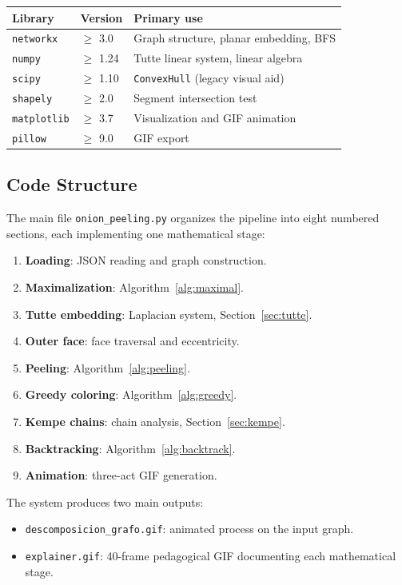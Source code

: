 \documentclass[12pt,letterpaper]{article}
\theoremstyle{plain}
\theoremstyle{definition}
\theoremstyle{remark}
\begin{document}
\begin{center}
\begin{tabular}{lll}
\toprule
\textbf{Library} & \textbf{Version} & \textbf{Primary use} \\
\midrule
\texttt{networkx}  & $\geq$ 3.0  & Graph structure, planar embedding, BFS \\
\texttt{numpy}     & $\geq$ 1.24 & Tutte linear system, linear algebra \\
\texttt{scipy}     & $\geq$ 1.10 & \texttt{ConvexHull} (legacy visual aid) \\
\texttt{shapely}   & $\geq$ 2.0  & Segment intersection test \\
\texttt{matplotlib}& $\geq$ 3.7  & Visualization and GIF animation \\
\texttt{pillow}    & $\geq$ 9.0  & GIF export \\
\bottomrule
\end{tabular}
\end{center}

\subsection{Code Structure}

The main file \texttt{onion\_peeling.py} organizes the pipeline into eight
numbered sections, each implementing one mathematical stage:

\begin{enumerate}[noitemsep]
    \item \textbf{Loading}: JSON reading and graph construction.
    \item \textbf{Maximalization}: Algorithm~\ref{alg:maximal}.
    \item \textbf{Tutte embedding}: Laplacian system, Section~\ref{sec:tutte}.
    \item \textbf{Outer face}: face traversal and eccentricity.
    \item \textbf{Peeling}: Algorithm~\ref{alg:peeling}.
    \item \textbf{Greedy coloring}: Algorithm~\ref{alg:greedy}.
    \item \textbf{Kempe chains}: chain analysis, Section~\ref{sec:kempe}.
    \item \textbf{Backtracking}: Algorithm~\ref{alg:backtrack}.
    \item \textbf{Animation}: three-act GIF generation.
\end{enumerate}

The system produces two main outputs:
\begin{itemize}[noitemsep]
    \item \texttt{descomposicion\_grafo.gif}: animated process on the input graph.
    \item \texttt{explainer.gif}: 40-frame pedagogical GIF documenting each
        mathematical stage.
\end{itemize}
\end{document}
